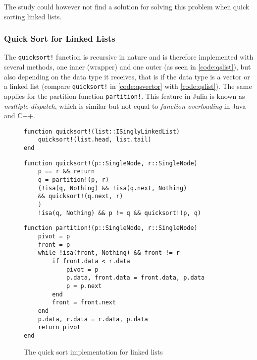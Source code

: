 \documentclass[a4paper, 11pt]{article}
\begin{document}
    The study could however not find a solution for solving this problem
    when quick sorting linked lists.

    \clearpage
    \subsubsection*{Quick Sort for Linked Lists}
    The \texttt{quicksort!} function is recursive in nature and is therefore implemented with 
    several methods, one inner (wrapper) and one outer (as seen in \autoref{code:qslist}), 
    but also depending on the data type it receives, 
    that is if the data type is a vector or a linked list 
    (compare \texttt{quicksort!} in 
    \autoref{code:qsvector} with \autoref{code:qslist}). 
    The same applies for the partition function \texttt{partition!}.
    This feature in Julia is known as \emph{multiple dispatch}, 
    which is similar but not equal to \emph{function overloading} in Java and C++. 

    \begin{figure}[h]
        \centering
    \begin{verbatim}
function quicksort!(list::ISinglyLinkedList) 
    quicksort!(list.head, list.tail)
end
    \end{verbatim}
    \begin{verbatim}
function quicksort!(p::SingleNode, r::SingleNode)
    p == r && return 
    q = partition!(p, r)
    (!isa(q, Nothing) && !isa(q.next, Nothing) 
    && quicksort!(q.next, r)
    )
    !isa(q, Nothing) && p != q && quicksort!(p, q)
    \end{verbatim}
    \begin{verbatim}
function partition!(p::SingleNode, r::SingleNode)
    pivot = p
    front = p
    while !isa(front, Nothing) && front != r
        if front.data < r.data
            pivot = p
            p.data, front.data = front.data, p.data
            p = p.next
        end
        front = front.next
    end
    p.data, r.data = r.data, p.data
    return pivot
end
    \end{verbatim}
    \caption{The quick sort implementation for linked lists}
    \label{code:qslist} %
    \end{figure}
\end{document}
